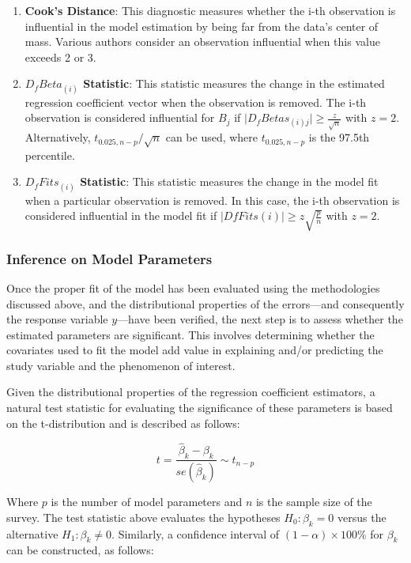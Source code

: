 \documentclass[
  12pt,
]{book}
\providecommand{\tightlist}{%
  \setlength{\itemsep}{0pt}\setlength{\parskip}{0pt}}
\begin{document}
\begin{enumerate}
\def\labelenumi{\arabic{enumi}.}
\tightlist
\item
  \textbf{Cook's Distance}: This diagnostic measures whether the i-th observation is influential in the model estimation by being far from the data's center of mass. Various authors consider an observation influential when this value exceeds 2 or 3.
\item
  \textbf{\(D_fBeta_{(i)}\) Statistic}: This statistic measures the change in the estimated regression coefficient vector when the observation is removed. The i-th observation is considered influential for \(B_j\) if \(\mid D_{f}Betas_{\left(i\right)j}\mid \geq \frac{z}{\sqrt{n}}\) with \(z = 2\). Alternatively, \(t_{0.025,n-p}/\sqrt{n}\) can be used, where \(t_{0.025,n-p}\) is the 97.5th percentile.
\item
  \textbf{\(D_{f}Fits_{\left(i\right)}\) Statistic}: This statistic measures the change in the model fit when a particular observation is removed. In this case, the i-th observation is considered influential in the model fit if \(\mid DfFits\left(i\right)\mid \geq z\sqrt{\frac{p}{n}}\) with \(z = 2\).
\end{enumerate}

\hypertarget{inference-on-model-parameters}{%
\subsubsection{Inference on Model Parameters}\label{inference-on-model-parameters}}

Once the proper fit of the model has been evaluated using the methodologies discussed above, and the distributional properties of the errors---and consequently the response variable \(y\)---have been verified, the next step is to assess whether the estimated parameters are significant. This involves determining whether the covariates used to fit the model add value in explaining and/or predicting the study variable and the phenomenon of interest.

Given the distributional properties of the regression coefficient estimators, a natural test statistic for evaluating the significance of these parameters is based on the t-distribution and is described as follows:

\[
t = \frac{\hat{\beta}_{k}-\beta_{k}}{se\left(\hat{\beta}_{k}\right)}\sim t_{n-p}
\]

Where \(p\) is the number of model parameters and \(n\) is the sample size of the survey. The test statistic above evaluates the hypotheses \(H_{0}:\beta_{k}=0\) versus the alternative \(H_{1}:\beta_{k}\neq0\). Similarly, a confidence interval of \((1-\alpha)\times100\%\) for \(\beta_{k}\) can be constructed, as follows:
\end{document}
